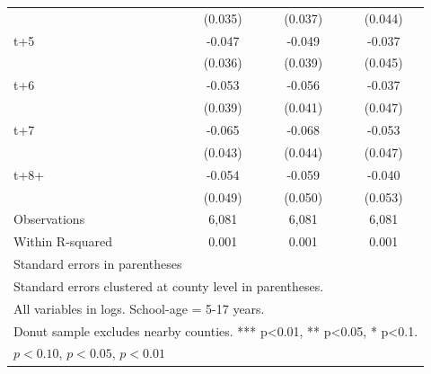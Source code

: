 \begin{table}[htbp]
\begin{tabular}{l*{3}{c}}
            &     (0.035)         &     (0.037)         &     (0.044)         \\
[1em]
t+5         &      -0.047         &      -0.049         &      -0.037         \\
            &     (0.036)         &     (0.039)         &     (0.045)         \\
[1em]
t+6         &      -0.053         &      -0.056         &      -0.037         \\
            &     (0.039)         &     (0.041)         &     (0.047)         \\
[1em]
t+7         &      -0.065         &      -0.068         &      -0.053         \\
            &     (0.043)         &     (0.044)         &     (0.047)         \\
[1em]
t+8+        &      -0.054         &      -0.059         &      -0.040         \\
            &     (0.049)         &     (0.050)         &     (0.053)         \\
\hline
Observations&       6,081         &       6,081         &       6,081         \\
Within R-squared&       0.001         &       0.001         &       0.001         \\
\hline\hline
\multicolumn{4}{l}{\footnotesize Standard errors in parentheses}\\
\multicolumn{4}{l}{\footnotesize Standard errors clustered at county level in parentheses.}\\
\multicolumn{4}{l}{\footnotesize All variables in logs. School-age = 5-17 years.}\\
\multicolumn{4}{l}{\footnotesize Donut sample excludes nearby counties. *** p<0.01, ** p<0.05, * p<0.1.}\\
\multicolumn{4}{l}{\footnotesize \sym{*} \(p<0.10\), \sym{**} \(p<0.05\), \sym{***} \(p<0.01\)}\\
\end{tabular}
\end{table}
